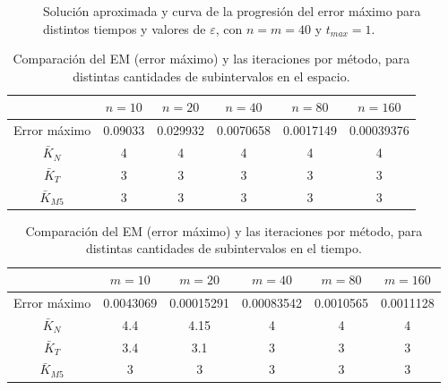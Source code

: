 \begin{figure}[h!]
	 \vspace{6pt}
	\caption{Solución aproximada y curva de la progresión del error máximo para distintos tiempos y valores de $\varepsilon$, con \mbox{$n=m=40$} y $t_{max}=1$.}
	\label{atenuaciones}
\end{figure}

\begin{table}[h!]
	\centering
	\small
	\begin{tabular}{cccccc}
		\toprule
		&\boldmath $n=10$ &\boldmath $n=20$ &\boldmath $n=40$ &\boldmath $n=80$ &\boldmath $n=160$ \\ \midrule
		\multicolumn{1}{c}{Error máximo}    & 0.09033    &  0.029932   &  0.0070658   & 0.0017149   &   0.00039376   \\
		\multicolumn{1}{c}{$\bar{K}_N$} &  4   &  4   &   4  &  4   &  4    \\
		\multicolumn{1}{c}{$\bar{K}_T$}  &  3   &   3  &   3  &   3  &   3   \\
		\multicolumn{1}{c}{$\bar{K}_{M5}$}     &  3    &  3   &  3   &  3   &   3   \\ \bottomrule
	\end{tabular}
	\caption{Comparación del EM (error máximo) y las iteraciones por método, para distintas cantidades de subintervalos en el espacio.}\label{compn}
\end{table}

\begin{table}[h!]
	\centering
	\small
	\begin{tabular}{cccccc}
		\toprule
		&\boldmath $m=10$ &\boldmath $m=20$ &\boldmath $m=40$ &\boldmath $m=80$ &\boldmath $m=160$ \\ \midrule
		\multicolumn{1}{c}{Error máximo}    & 0.0043069    &  0.00015291   & 0.00083542   & 0.0010565  & 0.0011128    \\
		\multicolumn{1}{c}{$\bar{K}_{N}$} &  4.4  & 4.15  & 4   &   4 &  4   \\
		\multicolumn{1}{c}{$\bar{K}_{T}$}  &  3.4  &  3.1  &  3  &  3  &  3   \\
		\multicolumn{1}{c}{$\bar{K}_{M5}$}     &  3    &   3   &  3  &  3  &  3   \\ \bottomrule
	\end{tabular}
	\caption{Comparación del EM (error máximo) y las iteraciones por método, para distintas cantidades de subintervalos en el tiempo.}\label{compm}
\end{table}

